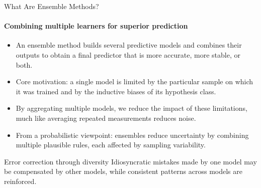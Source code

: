 \begin{frame}{What Are Ensemble Methods?}
  \framesubtitle{Combining multiple learners for superior prediction}
  \begin{itemize}
    \item An \alert{ensemble method} builds several predictive models and combines their outputs
          to obtain a final predictor that is more accurate, more stable, or both.
    \item Core motivation: a single model is limited by the particular sample on which it was
          trained and by the inductive biases of its hypothesis class.
    \item By \alert{aggregating multiple models}, we reduce the impact of these limitations,
          much like averaging repeated measurements reduces noise.
    \item From a probabilistic viewpoint: ensembles reduce \alert{uncertainty} by combining
          multiple plausible rules, each affected by sampling variability.
  \end{itemize}
  \begin{block}{Error correction through diversity}
    Idiosyncratic mistakes made by one model may be compensated by other models, while
    consistent patterns across models are \alert{reinforced}.
  \end{block}
\end{frame}

